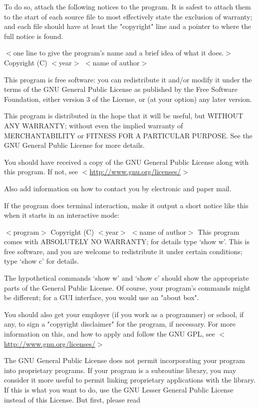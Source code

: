 To do so, attach the following notices to the program.  It is safest
to attach them to the start of each source file to most effectively
state the exclusion of warranty; and each file should have at least
the "copyright" line and a pointer to where the full notice is found.

\vparasmall
$<$one line to give the program's name and a brief idea of what it does.$>$
Copyright (C) $<$year$>$  $<$name of author$>$

This program is free software: you can redistribute it and/or modify
it under the terms of the GNU General Public License as published by
the Free Software Foundation, either version 3 of the License, or
(at your option) any later version.

This program is distributed in the hope that it will be useful,
but WITHOUT ANY WARRANTY; without even the implied warranty of
MERCHANTABILITY or FITNESS FOR A PARTICULAR PURPOSE.  See the
GNU General Public License for more details.

You should have received a copy of the GNU General Public License
along with this program.  If not, see 
$<$\href{http://www.gnu.org/licenses/}{http://www.gnu.org/licenses/}$>$ 

\vparasmall
Also add information on how to contact you by electronic and paper mail.

If the program does terminal interaction, make it output a short
notice like this when it starts in an interactive mode:

$<$program$>$  Copyright (C) $<$year$>$  $<$name of author$>$
This program comes with ABSOLUTELY NO WARRANTY; for details type `show w'.
This is free software, and you are welcome to redistribute it
under certain conditions; type `show c' for details.

The hypothetical commands `show w' and `show c' should show the appropriate
parts of the General Public License.  Of course, your program's commands
might be different; for a GUI interface, you would use an "about box".

You should also get your employer (if you work as a programmer) or school,
if any, to sign a "copyright disclaimer" for the program, if necessary.
For more information on this, and how to apply and follow the GNU GPL, see
$<$\href{http://www.gnu.org/licenses/}{http://www.gnu.org/licenses/}$>$ 

The GNU General Public License does not permit incorporating your program
into proprietary programs.  If your program is a subroutine library, you
may consider it more useful to permit linking proprietary applications with
the library.  If this is what you want to do, use the GNU Lesser General
Public License instead of this License.  But first, please read

